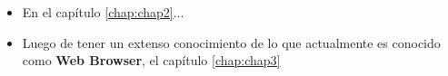 \begin{itemize}
	\item En el capítulo \ref{chap:chap2}... %
	\item Luego de tener un extenso conocimiento de lo que actualmente es conocido como \textbf{Web Browser}, el capítulo \ref{chap:chap3}
\end{itemize}













